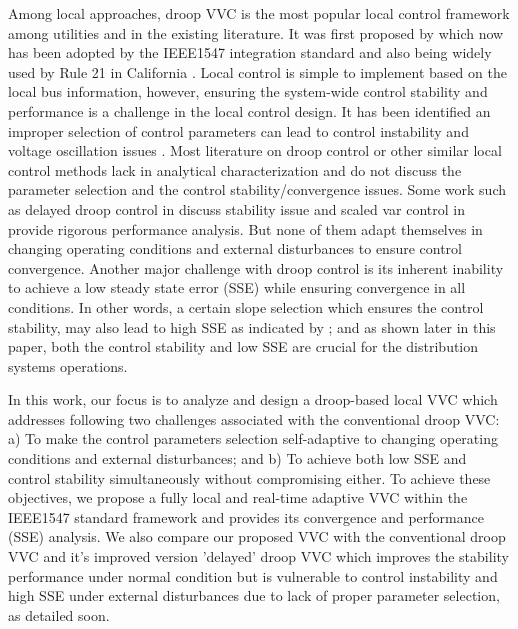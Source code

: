 \documentclass[journal]{IEEEtran}
\begin{document}
Among local approaches, droop VVC is the most popular local control framework among utilities and in the existing literature. It was first proposed by \cite{seal_standard_2010} which now has been adopted by the IEEE1547 integration standard \cite{noauthor_ieee_2018} and also being widely used by Rule 21 in California \cite{noauthor_rule_nodate}. Local control is simple to implement based on the local bus information, however, ensuring the system-wide control stability and performance is a challenge in the local control design. It has been identified an improper selection of control parameters can lead to control instability and voltage oscillation issues \cite{andren_stability_2015,farivar_equilibrium_2013,jahangiri_distributed_2013}. Most literature on droop control \cite{zhang_three-stage_2017,malekpour_dynamic_2017,karthikeyan_coordinated_2017} or other similar local control methods \cite{shah_online_2016,safavizadeh_voltage_2017} lack in analytical characterization and do not discuss the parameter selection and the control stability/convergence issues. Some work such as delayed droop control in \cite{jahangiri_distributed_2013}  discuss stability issue and scaled var control in \cite{zhu_fast_2016} provide rigorous performance analysis. But none of them adapt themselves in changing operating conditions and external disturbances to ensure control convergence. Another major challenge with droop control is its inherent inability to achieve a low steady state error (SSE) while ensuring convergence in all conditions. In other words, a certain slope selection which ensures the control stability, may also lead to high SSE as indicated by \cite{farivar_equilibrium_2013}; and as shown later in this paper, both the control stability and low SSE are crucial for the distribution systems operations. 

In this work, our focus is to analyze and design a droop-based local VVC which addresses following two challenges associated with the conventional droop VVC: a) To make the control parameters selection self-adaptive to changing operating conditions and external disturbances; and b) To achieve both low SSE and control stability simultaneously without compromising either. To achieve these objectives, we propose a fully local and real-time adaptive VVC within the IEEE1547 standard framework and provides its convergence and performance (SSE) analysis. We also compare our proposed VVC with the conventional droop VVC and it's improved version 'delayed' droop VVC \cite{jahangiri_distributed_2013} which improves the stability performance under normal condition but is vulnerable to control instability and high SSE under external disturbances due to lack of proper parameter selection, as detailed soon.
 
\end{document}
